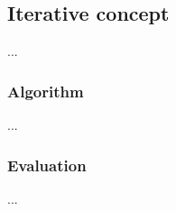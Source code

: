 \subsection{Iterative concept}

...

\subsubsection{Algorithm}

...

\subsubsection{Evaluation}

...

